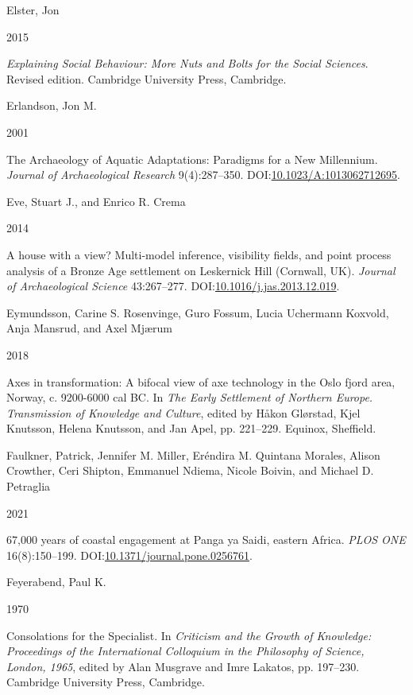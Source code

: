 \documentclass[
  12pt,
  a4paper,
  oneside]{book}
\newlength{\cslhangindent}
\newlength{\csllabelwidth}
\newlength{\cslentryspacingunit} %
\newenvironment{CSLReferences}[2] %
 {%
  \setlength{\parindent}{0pt}
  \ifodd #1
  \let\oldpar\par
  \def\par{\hangindent=\cslhangindent\oldpar}
  \fi
  \setlength{\parskip}{#2\cslentryspacingunit}
 }%
 {}
\newcommand{\CSLBlock}[1]{#1\hfill\break}
\newcommand{\CSLLeftMargin}[1]{\parbox[t]{\csllabelwidth}{#1}}
\newcommand{\CSLRightInline}[1]{\parbox[t]{\linewidth - \csllabelwidth}{#1}\break}
\begin{document}
\begin{CSLReferences}{0}{0}
\leavevmode{}%
\CSLBlock{Elster, Jon}
\CSLLeftMargin{ 2015}
\CSLRightInline{\emph{{Explaining Social Behaviour: More Nuts and Bolts for the Social Sciences}}. Revised edition. Cambridge University Press, Cambridge.}

\leavevmode{}%
\CSLBlock{Erlandson, Jon M.}
\CSLLeftMargin{ 2001}
\CSLRightInline{{The Archaeology of Aquatic Adaptations: Paradigms for a New Millennium}. \emph{Journal of Archaeological Research} 9(4):287--350. DOI:\href{https://doi.org/10.1023/A:1013062712695}{10.1023/A:1013062712695}.}

\leavevmode{}%
\CSLBlock{Eve, Stuart J., and Enrico R. Crema}
\CSLLeftMargin{ 2014}
\CSLRightInline{{A house with a view? Multi-model inference, visibility fields, and point process analysis of a Bronze Age settlement on Leskernick Hill (Cornwall, UK)}. \emph{Journal of Archaeological Science} 43:267--277. DOI:\href{https://doi.org/10.1016/j.jas.2013.12.019}{10.1016/j.jas.2013.12.019}.}

\leavevmode{}%
\CSLBlock{Eymundsson, Carine S. Rosenvinge, Guro Fossum, Lucia Uchermann Koxvold, Anja Mansrud, and Axel Mjærum}
\CSLLeftMargin{ 2018}
\CSLRightInline{{Axes in transformation: A bifocal view of axe technology in the Oslo fjord area, Norway, c. 9200-6000 cal BC}. In \emph{{The Early Settlement of Northern Europe. Transmission of Knowledge and Culture}}, edited by Håkon Glørstad, Kjel Knutsson, Helena Knutsson, and Jan Apel, pp. 221--229. Equinox, Sheffield.}

\leavevmode{}%
\CSLBlock{Faulkner, Patrick, Jennifer M. Miller, Eréndira M. Quintana Morales, Alison Crowther, Ceri Shipton, Emmanuel Ndiema, Nicole Boivin, and Michael D. Petraglia}
\CSLLeftMargin{ 2021}
\CSLRightInline{67,000 years of coastal engagement at Panga ya Saidi, eastern Africa. \emph{PLOS ONE} 16(8):150--199. DOI:\href{https://doi.org/10.1371/journal.pone.0256761}{10.1371/journal.pone.0256761}.}

\leavevmode{}%
\CSLBlock{Feyerabend, Paul K.}
\CSLLeftMargin{ 1970}
\CSLRightInline{{Consolations for the Specialist}. In \emph{{Criticism and the Growth of Knowledge: Proceedings of the International Colloquium in the Philosophy of Science, London, 1965}}, edited by Alan Musgrave and Imre Lakatos, pp. 197--230. Cambridge University Press, Cambridge.}


\end{CSLReferences}
\end{document}
